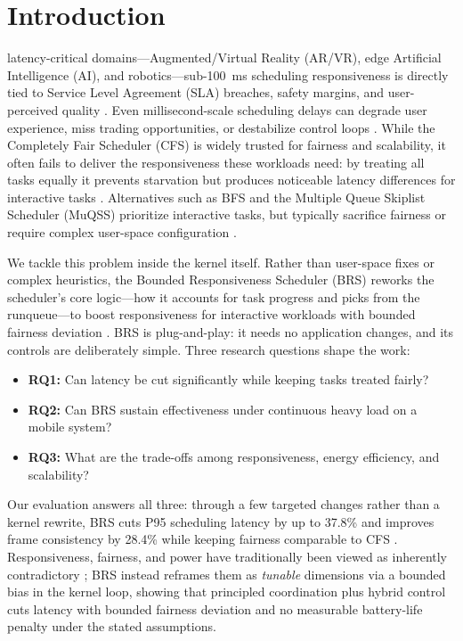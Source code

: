 \section{Introduction}

\label{sec:introduction}

 latency-critical domains---Augmented/Virtual Reality (AR/VR), edge Artificial Intelligence (AI), and robotics---sub-\SI{100}{\milli\second} scheduling responsiveness is directly tied to Service Level Agreement (SLA) breaches, safety margins, and user-perceived quality \cite{10306992,4624248,5580094,9351534}. Even millisecond-scale scheduling delays can degrade user experience, miss trading opportunities, or destabilize control loops \cite{8762113,4624248,7792746}. While the Completely Fair Scheduler (CFS) is widely trusted for fairness and scalability, it often fails to deliver the responsiveness these workloads need: by treating all tasks equally it prevents starvation but produces noticeable latency differences for interactive tasks \cite{Bouron2018Battle,241774}. Alternatives such as BFS and the Multiple Queue Skiplist Scheduler (MuQSS) prioritize interactive tasks, but typically sacrifice fairness or require complex user-space configuration \cite{10306992,2020ThreadEK,7426385,1324648}.

We tackle this problem inside the kernel itself. Rather than user-space fixes or complex heuristics, the Bounded Responsiveness Scheduler (BRS) reworks the scheduler's core logic---how it accounts for task progress and picks from the runqueue---to boost responsiveness for interactive workloads with bounded fairness deviation \cite{4663063,8360522}. BRS is plug-and-play: it needs no application changes, and its controls are deliberately simple. Three research questions shape the work:
\begin{itemize}
 \item \textbf{RQ1:} Can latency be cut significantly while keeping tasks treated fairly?
 \item \textbf{RQ2:} Can BRS sustain effectiveness under continuous heavy load on a mobile system?
 \item \textbf{RQ3:} What are the trade-offs among responsiveness, energy efficiency, and scalability?
\end{itemize}

Our evaluation answers all three: through a few targeted changes rather than a kernel rewrite, BRS cuts P95 scheduling latency by up to 37.8\% and improves frame consistency by 28.4\% while keeping fairness comparable to CFS \cite{6365626,7426385}. Responsiveness, fairness, and power have traditionally been viewed as inherently contradictory \cite{Bouron2018Battle,1244943,8338088}; BRS instead reframes them as \emph{tunable} dimensions via a bounded bias in the kernel loop, showing that principled coordination plus hybrid control cuts latency with bounded fairness deviation and no measurable battery-life penalty under the stated assumptions.


